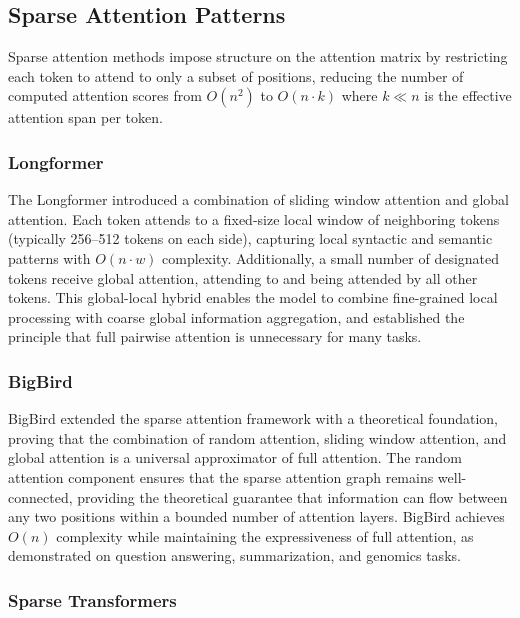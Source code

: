 \documentclass[11pt,letterpaper]{article}
\begin{document}
\subsection{Sparse Attention Patterns}

Sparse attention methods impose structure on the attention matrix by restricting each token to attend to only a subset of positions, reducing the number of computed attention scores from $O(n^2)$ to $O(n \cdot k)$ where $k \ll n$ is the effective attention span per token.

\subsubsection{Longformer}

The Longformer \cite{beltagy2020longformer} introduced a combination of sliding window attention and global attention. Each token attends to a fixed-size local window of neighboring tokens (typically 256--512 tokens on each side), capturing local syntactic and semantic patterns with $O(n \cdot w)$ complexity. Additionally, a small number of designated tokens receive global attention, attending to and being attended by all other tokens. This global-local hybrid enables the model to combine fine-grained local processing with coarse global information aggregation, and established the principle that full pairwise attention is unnecessary for many tasks.

\subsubsection{BigBird}

BigBird \cite{zaheer2020bigbird} extended the sparse attention framework with a theoretical foundation, proving that the combination of random attention, sliding window attention, and global attention is a universal approximator of full attention. The random attention component ensures that the sparse attention graph remains well-connected, providing the theoretical guarantee that information can flow between any two positions within a bounded number of attention layers. BigBird achieves $O(n)$ complexity while maintaining the expressiveness of full attention, as demonstrated on question answering, summarization, and genomics tasks.

\subsubsection{Sparse Transformers}
\end{document}
